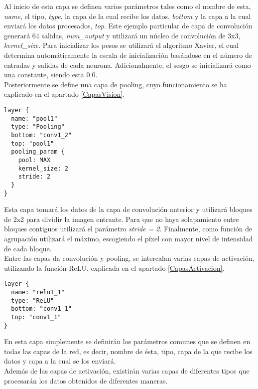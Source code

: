 \documentclass[a4paper, 12pt, spanish, chapterprefix, numbers=noenddot]{book}
\begin{document}
Al inicio de esta capa se definen varios parámetros tales como el nombre de esta, \textit{name}, el tipo, \textit{type}, la capa de la cual recibe los datos, \textit{bottom} y la capa a la cual enviará los datos procesados, \textit{top}. Este ejemplo particular de capa de convolución generará 64 salidas, \textit{num\_output} y utilizará un núcleo de convolución de 3x3, \textit{kernel\_size}. Para inicializar los pesos se utilizará el algoritmo Xavier, el cual determina automáticamente la escala de inicialización basándose en el número de entradas y salidas de cada neurona. Adicionalmente, el sesgo se inicializará como una constante, siendo esta 0.0.\\

Posteriormente se define una capa de pooling, cuyo funcionamiento se ha explicado en el apartado \ref{CapasVision}.\\

\begin{lstlisting}[frame=single]
layer {
  name: "pool1"
  type: "Pooling"
  bottom: "conv1_2"
  top: "pool1"
  pooling_param {
    pool: MAX
    kernel_size: 2
    stride: 2
  }
}
\end{lstlisting}

Esta capa tomará los datos de la capa de convolución anterior y utilizará bloques de 2x2 para dividir la imagen entrante. Para que no haya solapamiento entre bloques contiguos utilizará el parámetro \textit{stride = 2}. Finalmente, como función de agrupación utilizará el máximo, escogiendo el píxel con mayor nivel de intensidad de cada bloque.\\

Entre las capas da convolución y pooling, se intercalan varias capas de activación, utilizando la función ReLU, explicada en el apartado \ref{CapasActivacion}.\\

\begin{lstlisting}[frame=single]
layer {
  name: "relu1_1"
  type: "ReLU"
  bottom: "conv1_1"
  top: "conv1_1"
}
\end{lstlisting}

En esta capa simplemente se definirán los parámetros comunes que se definen en todas las capas de la red, es decir, nombre de ésta, tipo, capa de la que recibe los datos y capa a la cual se los enviará.\\

Además de las capas de activación, existirán varias capas de diferentes tipos que procesarán los datos obtenidos de diferentes maneras.
\end{document}
